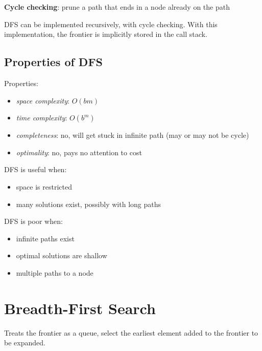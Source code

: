 \documentclass[11pt]{article}
\begin{document}
\textbf{Cycle checking}: prune a path that ends in a node already on the path

DFS can be implemented recursively, with cycle checking.
With this implementation, the frontier is implicitly stored in the call stack.
\subsection{Properties of DFS}
\label{sec:org41f3308}
Properties:
\begin{itemize}
\item \emph{space complexity}: \(O(bm)\)
\item \emph{time complexity}: \(O(b^{m})\)
\item \emph{completeness}: no, will get stuck in infinite path (may or may not be cycle)
\item \emph{optimality}: no, pays no attention to cost
\end{itemize}

DFS is useful when:
\begin{itemize}
\item space is restricted
\item many solutions exist, possibly with long paths
\end{itemize}

DFS is poor when:
\begin{itemize}
\item infinite paths exist
\item optimal solutions are shallow
\item multiple paths to a node
\end{itemize}
\section{Breadth-First Search}
\label{sec:orgd6ccbd6}
Treats the frontier as a queue, select the earliest element added to the frontier to be expanded.
\end{document}

